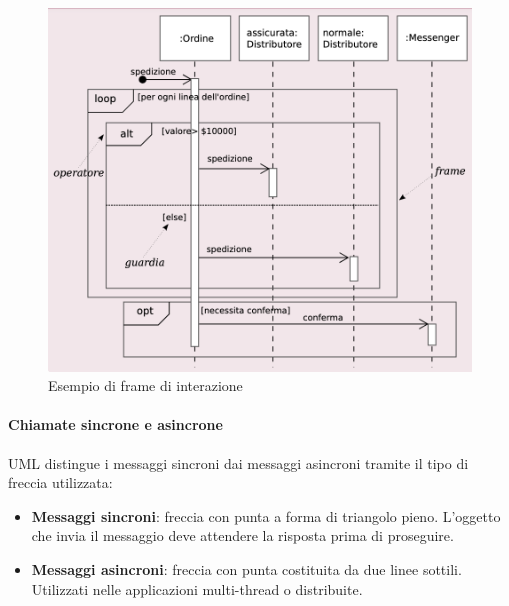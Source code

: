\begin{figure}[H]
    \centering
    \includegraphics[width=0.75\linewidth]{assets/UML/sequence/sequence-4.png}
    \caption{Esempio di frame di interazione}
\end{figure}

\paragraph{Chiamate sincrone e asincrone}
UML distingue i messaggi sincroni dai messaggi asincroni tramite il tipo di freccia utilizzata:
\begin{itemize}
    \item \textbf{Messaggi sincroni}: freccia con punta a forma di triangolo pieno. L’oggetto che invia il messaggio deve attendere la risposta prima di proseguire.
    \item \textbf{Messaggi asincroni}: freccia con punta costituita da due linee sottili. Utilizzati nelle applicazioni multi-thread o distribuite.
\end{itemize}

\newpage